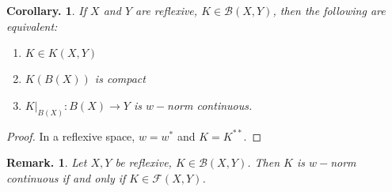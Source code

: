 \documentclass[11pt, a4paper]{memoir}
\theoremstyle{change}
\newtheorem{corollary}[theorem]{Corollary.}
\theoremstyle{plain}
\theoremstyle{nonumberplain}
\newtheorem{remark}{Remark.}
\newtheorem{proof}{Proof}
\numberwithin{equation}{section}
\begin{document}
\begin{corollary}
    If $X$ and $Y$ are reflexive, $K\in\mathcal{B}(X,Y)$, then the following are equivalent:
    \begin{enumerate}[nl,r]
        \item $K\in K(X,Y)$
        \item $K(B(X))$ is compact
        \item $K|_{B(X)}:B(X)\to Y$ is $w-$norm continuous.
    \end{enumerate}
\end{corollary}
\begin{proof}
    In a reflexive space, $w=w^*$ and $K=K^{**}$.
\end{proof}
\begin{remark}
    Let $X,Y$ be reflexive, $K\in\mathcal{B}(X,Y)$.
    Then $K$ is $w-$norm continuous if and only if $K\in\mathcal{F}(X,Y)$.
\end{remark}
\end{document}
